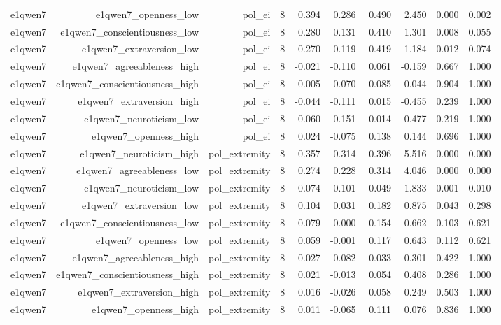 \documentclass[11pt]{article}
\begin{document}
\begin{landscape}
\begin{longtable}{@{}lrrrrrrrrr@{}}
e1qwen7 & e1qwen7\_openness\_low & pol\_ei & 8 & 0.394 & 0.286 & 0.490 & 2.450 & 0.000 & 0.002 \\
e1qwen7 & e1qwen7\_conscientiousness\_low & pol\_ei & 8 & 0.280 & 0.131 & 0.410 & 1.301 & 0.008 & 0.055 \\
e1qwen7 & e1qwen7\_extraversion\_low & pol\_ei & 8 & 0.270 & 0.119 & 0.419 & 1.184 & 0.012 & 0.074 \\
e1qwen7 & e1qwen7\_agreeableness\_high & pol\_ei & 8 & -0.021 & -0.110 & 0.061 & -0.159 & 0.667 & 1.000 \\
e1qwen7 & e1qwen7\_conscientiousness\_high & pol\_ei & 8 & 0.005 & -0.070 & 0.085 & 0.044 & 0.904 & 1.000 \\
e1qwen7 & e1qwen7\_extraversion\_high & pol\_ei & 8 & -0.044 & -0.111 & 0.015 & -0.455 & 0.239 & 1.000 \\
e1qwen7 & e1qwen7\_neuroticism\_low & pol\_ei & 8 & -0.060 & -0.151 & 0.014 & -0.477 & 0.219 & 1.000 \\
e1qwen7 & e1qwen7\_openness\_high & pol\_ei & 8 & 0.024 & -0.075 & 0.138 & 0.144 & 0.696 & 1.000 \\
e1qwen7 & e1qwen7\_neuroticism\_high & pol\_extremity & 8 & 0.357 & 0.314 & 0.396 & 5.516 & 0.000 & 0.000 \\
e1qwen7 & e1qwen7\_agreeableness\_low & pol\_extremity & 8 & 0.274 & 0.228 & 0.314 & 4.046 & 0.000 & 0.000 \\
e1qwen7 & e1qwen7\_neuroticism\_low & pol\_extremity & 8 & -0.074 & -0.101 & -0.049 & -1.833 & 0.001 & 0.010 \\
e1qwen7 & e1qwen7\_extraversion\_low & pol\_extremity & 8 & 0.104 & 0.031 & 0.182 & 0.875 & 0.043 & 0.298 \\
e1qwen7 & e1qwen7\_conscientiousness\_low & pol\_extremity & 8 & 0.079 & -0.000 & 0.154 & 0.662 & 0.103 & 0.621 \\
e1qwen7 & e1qwen7\_openness\_low & pol\_extremity & 8 & 0.059 & -0.001 & 0.117 & 0.643 & 0.112 & 0.621 \\
e1qwen7 & e1qwen7\_agreeableness\_high & pol\_extremity & 8 & -0.027 & -0.082 & 0.033 & -0.301 & 0.422 & 1.000 \\
e1qwen7 & e1qwen7\_conscientiousness\_high & pol\_extremity & 8 & 0.021 & -0.013 & 0.054 & 0.408 & 0.286 & 1.000 \\
e1qwen7 & e1qwen7\_extraversion\_high & pol\_extremity & 8 & 0.016 & -0.026 & 0.058 & 0.249 & 0.503 & 1.000 \\
e1qwen7 & e1qwen7\_openness\_high & pol\_extremity & 8 & 0.011 & -0.065 & 0.111 & 0.076 & 0.836 & 1.000 \\

\end{longtable}
\end{landscape}
\end{document}
